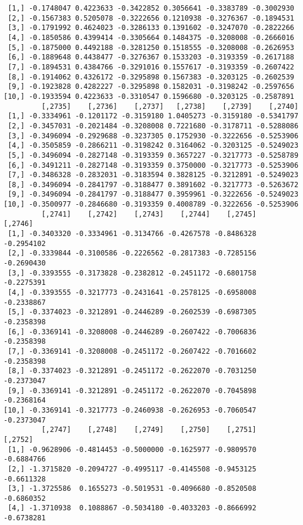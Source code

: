 \documentclass[
  letterpaper,
  DIV=11,
  numbers=noendperiod]{scrreprt}
\begin{document}
\begin{verbatim}
 [1,] -0.1748047 0.4223633 -0.3422852 0.3056641 -0.3383789 -0.3002930
 [2,] -0.1567383 0.5205078 -0.3222656 0.1210938 -0.3276367 -0.1894531
 [3,] -0.1791992 0.4624023 -0.3286133 0.1391602 -0.3247070 -0.2822266
 [4,] -0.1850586 0.4399414 -0.3305664 0.1484375 -0.3208008 -0.2666016
 [5,] -0.1875000 0.4492188 -0.3281250 0.1518555 -0.3208008 -0.2626953
 [6,] -0.1889648 0.4438477 -0.3276367 0.1533203 -0.3193359 -0.2617188
 [7,] -0.1894531 0.4384766 -0.3291016 0.1557617 -0.3193359 -0.2607422
 [8,] -0.1914062 0.4326172 -0.3295898 0.1567383 -0.3203125 -0.2602539
 [9,] -0.1923828 0.4282227 -0.3295898 0.1582031 -0.3198242 -0.2597656
[10,] -0.1933594 0.4223633 -0.3310547 0.1596680 -0.3203125 -0.2587891
         [,2735]    [,2736]    [,2737]   [,2738]    [,2739]    [,2740]
 [1,] -0.3334961 -0.1201172 -0.3159180 1.0405273 -0.3159180 -0.5341797
 [2,] -0.3457031 -0.2021484 -0.3208008 0.7221680 -0.3178711 -0.5288086
 [3,] -0.3496094 -0.2929688 -0.3237305 0.1752930 -0.3222656 -0.5253906
 [4,] -0.3505859 -0.2866211 -0.3198242 0.3164062 -0.3203125 -0.5249023
 [5,] -0.3496094 -0.2827148 -0.3193359 0.3657227 -0.3217773 -0.5258789
 [6,] -0.3491211 -0.2827148 -0.3193359 0.3750000 -0.3217773 -0.5253906
 [7,] -0.3486328 -0.2832031 -0.3183594 0.3828125 -0.3212891 -0.5249023
 [8,] -0.3496094 -0.2841797 -0.3188477 0.3891602 -0.3217773 -0.5263672
 [9,] -0.3496094 -0.2841797 -0.3188477 0.3959961 -0.3222656 -0.5249023
[10,] -0.3500977 -0.2846680 -0.3193359 0.4008789 -0.3222656 -0.5253906
         [,2741]    [,2742]    [,2743]    [,2744]    [,2745]    [,2746]
 [1,] -0.3403320 -0.3334961 -0.3134766 -0.4267578 -0.8486328 -0.2954102
 [2,] -0.3339844 -0.3100586 -0.2226562 -0.2817383 -0.7285156 -0.2690430
 [3,] -0.3393555 -0.3173828 -0.2382812 -0.2451172 -0.6801758 -0.2275391
 [4,] -0.3393555 -0.3217773 -0.2431641 -0.2578125 -0.6958008 -0.2338867
 [5,] -0.3374023 -0.3212891 -0.2446289 -0.2602539 -0.6987305 -0.2358398
 [6,] -0.3369141 -0.3208008 -0.2446289 -0.2607422 -0.7006836 -0.2358398
 [7,] -0.3369141 -0.3208008 -0.2451172 -0.2607422 -0.7016602 -0.2358398
 [8,] -0.3374023 -0.3212891 -0.2451172 -0.2622070 -0.7031250 -0.2373047
 [9,] -0.3369141 -0.3212891 -0.2451172 -0.2622070 -0.7045898 -0.2368164
[10,] -0.3369141 -0.3217773 -0.2460938 -0.2626953 -0.7060547 -0.2373047
         [,2747]    [,2748]    [,2749]    [,2750]    [,2751]    [,2752]
 [1,] -0.9628906 -0.4814453 -0.5000000 -0.1625977 -0.9809570 -0.6884766
 [2,] -1.3715820 -0.2094727 -0.4995117 -0.4145508 -0.9453125 -0.6611328
 [3,] -1.3725586  0.1655273 -0.5019531 -0.4096680 -0.8520508 -0.6860352
 [4,] -1.3710938  0.1088867 -0.5034180 -0.4033203 -0.8666992 -0.6738281

\end{verbatim}
\end{document}
